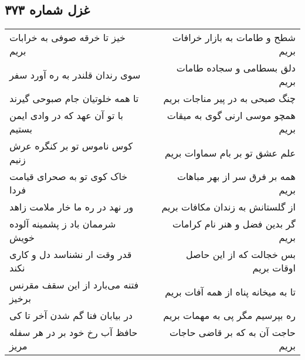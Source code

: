\begin{center}
\section*{غزل شماره ۳۷۳}
\label{sec:sh373}
\begin{longtable}{l p{0.5cm} r}
خیز تا خرقه صوفی به خرابات بریم
&&
شطح و طامات به بازار خرافات بریم
\\
سوی رندان قلندر به ره آورد سفر
&&
دلق بسطامی و سجاده طامات بریم
\\
تا همه خلوتیان جام صبوحی گیرند
&&
چنگ صبحی به در پیر مناجات بریم
\\
با تو آن عهد که در وادی ایمن بستیم
&&
همچو موسی ارنی گوی به میقات بریم
\\
کوس ناموس تو بر کنگره عرش زنیم
&&
علم عشق تو بر بام سماوات بریم
\\
خاک کوی تو به صحرای قیامت فردا
&&
همه بر فرق سر از بهر مباهات بریم
\\
ور نهد در ره ما خار ملامت زاهد
&&
از گلستانش به زندان مکافات بریم
\\
شرممان باد ز پشمینه آلوده خویش
&&
گر بدین فضل و هنر نام کرامات بریم
\\
قدر وقت ار نشناسد دل و کاری نکند
&&
بس خجالت که از این حاصل اوقات بریم
\\
فتنه می‌بارد از این سقف مقرنس برخیز
&&
تا به میخانه پناه از همه آفات بریم
\\
در بیابان فنا گم شدن آخر تا کی
&&
ره بپرسیم مگر پی به مهمات بریم
\\
حافظ آب رخ خود بر در هر سفله مریز
&&
حاجت آن به که بر قاضی حاجات بریم
\\
\end{longtable}
\end{center}
